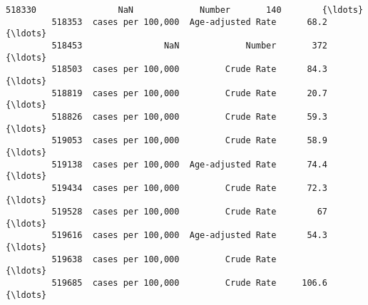 \documentclass[11pt]{article}
\begin{document}
\begin{Verbatim}[commandchars=\\\{\}]
         518330                NaN             Number       140        {\ldots}          
         518353  cases per 100,000  Age-adjusted Rate      68.2        {\ldots}          
         518453                NaN             Number       372        {\ldots}          
         518503  cases per 100,000         Crude Rate      84.3        {\ldots}          
         518819  cases per 100,000         Crude Rate      20.7        {\ldots}          
         518826  cases per 100,000         Crude Rate      59.3        {\ldots}          
         519053  cases per 100,000         Crude Rate      58.9        {\ldots}          
         519138  cases per 100,000  Age-adjusted Rate      74.4        {\ldots}          
         519434  cases per 100,000         Crude Rate      72.3        {\ldots}          
         519528  cases per 100,000         Crude Rate        67        {\ldots}          
         519616  cases per 100,000  Age-adjusted Rate      54.3        {\ldots}          
         519638  cases per 100,000         Crude Rate                  {\ldots}          
         519685  cases per 100,000         Crude Rate     106.6        {\ldots}          
         

\end{Verbatim}
\end{document}
